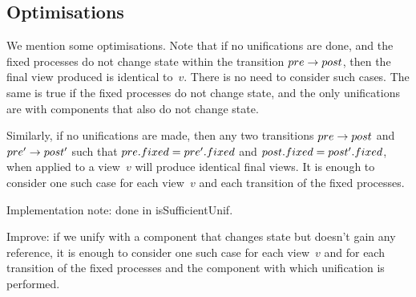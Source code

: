 




\subsection{Optimisations}

We mention some optimisations.  Note that if no unifications are done, and the
fixed processes do not change state within the transition $pre \stackrel{}\rightarrow post$,
then the final view produced is identical to~$v$.  There is no need to
consider such cases.  The same is true if the fixed processes do not change
state, and the only unifications are with components that also do not change
state. 

Similarly, if no unifications are made, then any two transitions $pre \stackrel{}\rightarrow
post$ and $pre' \stackrel{}\rightarrow post'$ such that $pre.fixed = pre'.fixed$ and
$post.fixed = post'.fixed$, when applied to a view~$v$ will produce identical
final views.  It is enough to consider one such case for each view~$v$ and
each transition of the fixed processes.

Implementation note: done in isSufficientUnif. 

Improve: if we unify with a component that changes state but doesn't gain any
reference, it is enough to consider one such case for each view~$v$ and for
each transition of the fixed processes and the component with which
unification is performed. 

